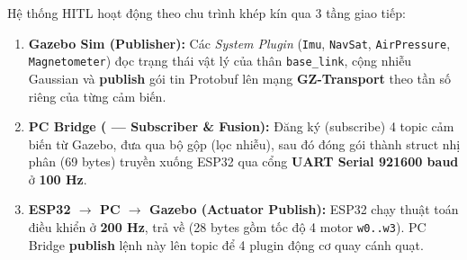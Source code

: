 \documentclass[11pt,a4paper]{article}
\begin{document}
Hệ thống HITL hoạt động theo chu trình khép kín qua 3 tầng giao tiếp:
\begin{enumerate}[leftmargin=1.5em, itemsep=0.2em]
    \item \textbf{Gazebo Sim (Publisher):} Các \emph{System Plugin} (\texttt{Imu}, \texttt{NavSat}, \texttt{AirPressure}, \texttt{Magnetometer}) đọc trạng thái vật lý của thân \texttt{base\_link}, cộng nhiễu Gaussian và \textbf{publish} gói tin Protobuf lên mạng \textbf{GZ-Transport} theo tần số riêng của từng cảm biến.
    \item \textbf{PC Bridge ( — Subscriber \& Fusion):} Đăng ký (subscribe) 4 topic cảm biến từ Gazebo, đưa qua bộ gộp  (lọc nhiễu), sau đó đóng gói thành struct nhị phân  (69 bytes) truyền xuống ESP32 qua cổng \textbf{UART Serial 921600 baud} ở \textbf{100 Hz}.
    \item \textbf{ESP32 $\rightarrow$ PC $\rightarrow$ Gazebo (Actuator Publish):} ESP32 chạy thuật toán điều khiển ở \textbf{200 Hz}, trả về  (28 bytes gồm tốc độ 4 motor \texttt{w0..w3}). PC Bridge \textbf{publish} lệnh này lên topic  để 4 plugin động cơ quay cánh quạt.
\end{enumerate}
\end{document}
